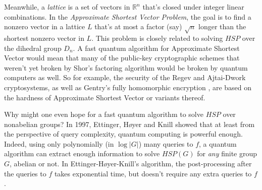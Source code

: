 \documentclass[12pt]{report}
\theoremstyle{plain}
\theoremstyle{definition}
\newcommand{\R}{{\mathbb R}}
\begin{document}
Meanwhile, a {\em lattice} is a set of vectors in $\R^n$ that's closed under integer linear combinations.  In the {\em Approximate Shortest Vector Problem}, the goal is to find a nonzero vector in a lattice $L$ that's at most a factor (say) $\sqrt{n}$ longer than the shortest nonzero vector in $L$.
This problem is closely related to solving $HSP$ over the dihedral group $D_n$.  A fast quantum algorithm for Approximate Shortest Vector would
mean that many of the public-key cryptographic schemes that weren't yet broken by Shor's factoring algorithm would be broken by quantum computers as well.
So for example, the security of the Regev and Ajtai-Dwork cryptosystems, as well as Gentry's fully homomorphic encryption \cite{gentry}, are based on the hardness of Approximate Shortest Vector or variants thereof.

Why might one even hope for a fast quantum algorithm to solve $HSP$ over nonabelian groups? In 1997, Ettinger, H\o yer and Knill \cite{ehk} showed that
at least from the perspective of query complexity, quantum computing is powerful enough. Indeed, using only polynomially
(in $\log \left|G\right|$) many queries to $f$, a quantum algorithm can extract enough information to solve $HSP(G)$ for {\em any} finite group $G$, abelian or not.
In Ettinger-H\o yer-Knill's algorithm, the post-processing after the queries to $f$ takes exponential time, but doesn't require any extra queries to $f$.
\end{document}
